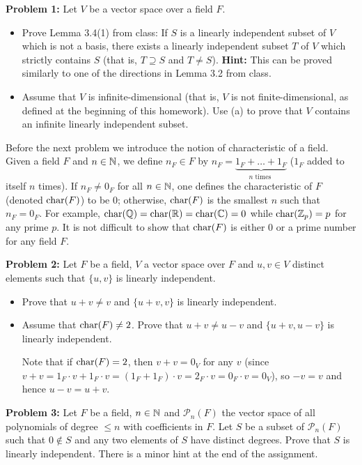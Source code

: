 \documentclass[11pt]{amsart}
\begin{document}
{\bf Problem 1:} Let $V$ be a vector space over a field $F$.
\begin{itemize}
\item[(a)] Prove Lemma 3.4(1) from class: If $S$ is a linearly independent subset of $V$ which is not a basis, there exists a
linearly independent subset $T$ of $V$ which strictly contains $S$ (that is, $T\supseteq S$ and $T\neq S$). {\bf Hint:} This
can be proved similarly to one of the directions in Lemma 3.2 from class.
\item[(b)] Assume that $V$ is infinite-dimensional (that is, $V$ is not finite-dimensional, as defined at the beginning of this homework).
Use (a) to prove that $V$ contains an infinite linearly independent subset. 
\end{itemize}

\skv
Before the next problem we introduce the notion of characteristic of a field. Given a field $F$ and $n\in{\mathbb N}$, we define $n_F\in F$
by $n_F=\underbrace{1_F+\ldots+1_F}_{n\mbox{ times }}$ ($1_F$ added to itself $n$ times). If $n_F\neq 0_F$ for all $n\in{\mathbb N}$, one
defines the characteristic of $F$ (denoted ${\rm char}(F)$) to be $0$; otherwise, ${\rm char}(F)$ is the smallest $n$ such that $n_F=0_F$.
For example, ${\rm char}({\mathbb Q})={\rm char}({\mathbb R})={\rm char}({\mathbb C})=0$ while ${\rm char}({\mathbb Z}_p)=p$ for any prime $p$. It is not difficult to show that
${\rm char}(F)$ is either $0$ or a prime number for any field $F$.

 \skv 
{\bf Problem 2:} Let $F$ be a field, $V$ a vector space over $F$ and $u,v\in V$ distinct elements such that $\{u,v\}$ is linearly independent. 
\skv
\begin{itemize}
\item[(a)] Prove that $u+v\neq v$ and
$\{u+v,v\}$ is linearly independent.
\item[(b)] Assume that ${\rm char}(F)\neq 2$. Prove that $u+v\neq u-v$ and
$\{u+v,u-v\}$ is linearly independent. 

Note that if ${\rm char}(F)=2$, then $v+v=0_V$ for any $v$ (since $v+v=1_F\cdot v +1_F\cdot v=
(1_F+1_F)\cdot v=2_F\cdot v=0_F\cdot v=0_V$), so $-v=v$ and hence $u-v=u+v$. 
\end{itemize}


\skv 
{\bf Problem 3:} Let $F$ be a field, $n\in{\mathbb N}$ and $\mathcal P_n(F)$ the vector space of all polynomials of degree $\leq n$
with coefficients in $F$. Let $S$ be a subset of $\mathcal P_n(F)$ such that $0\not\in S$ and any two elements
of $S$ have distinct degrees. Prove that $S$ is linearly independent. There is a minor hint at the end of the assignment.
\skv
\end{document}
